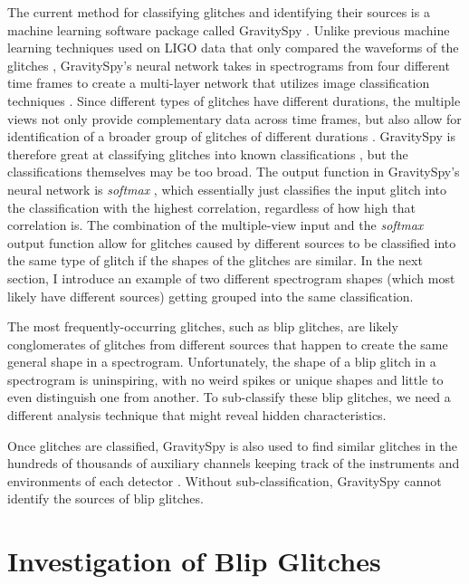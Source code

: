 \documentclass[a4paper]{article}
\begin{document}
The current method for classifying glitches and identifying their sources is a machine learning software package called GravitySpy \cite{Zevin:2016}. Unlike previous machine learning techniques used on LIGO data that only compared the waveforms of the glitches \cite{Mukherjee:2010}, GravitySpy's neural network takes in spectrograms from four different time frames to create a multi-layer network that utilizes image classification techniques \cite{Bahaadini:2017}. Since different types of glitches have different durations, the multiple views not only provide complementary data across time frames, but also allow for identification of a broader group of glitches of different durations \cite{Bahaadini:2017}. GravitySpy is therefore great at classifying glitches into known classifications \cite{Zevin:2016}, but the classifications themselves may be too broad. The output function in GravitySpy's neural network is \textit{softmax} \cite{Bahaadini:2017}, which essentially just classifies the input glitch into the classification with the highest correlation, regardless of how high that correlation is. The combination of the multiple-view input and the \textit{softmax} output function allow for glitches caused by different sources to be classified into the same type of glitch if the shapes of the glitches are similar. In the next section, I introduce an example of two different spectrogram shapes (which most likely have different sources) getting grouped into the same classification. 

The most frequently-occurring glitches, such as blip glitches, are likely conglomerates of glitches from different sources that happen to create the same general shape in a spectrogram. Unfortunately, the shape of a blip glitch in a spectrogram is uninspiring, with no weird spikes or unique shapes and little to even distinguish one from another. To sub-classify these blip glitches, we need a different analysis technique that might reveal hidden characteristics. 

Once glitches are classified, GravitySpy is also used to find similar glitches in the hundreds of thousands of auxiliary channels keeping track of the instruments and environments of each detector \cite{Zevin:2016}. Without sub-classification, GravitySpy cannot identify the sources of blip glitches. 

\section{Investigation of Blip Glitches}
\end{document}

